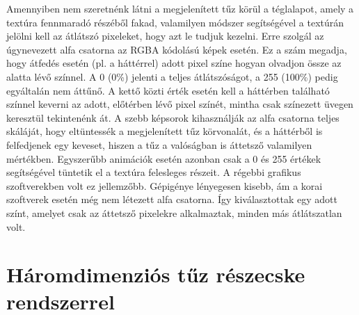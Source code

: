 Amennyiben nem szeretnénk látni a megjelenített tűz körül a téglalapot, amely a textúra fennmaradó részéből fakad, valamilyen módszer segítségével a textúrán jelölni kell az átlátszó pixeleket, hogy azt le tudjuk kezelni. Erre szolgál az úgynevezett alfa csatorna az RGBA kódolású képek esetén. Ez a szám megadja, hogy átfedés esetén (pl. a háttérrel) adott pixel színe hogyan olvadjon össze az alatta lévő színnel.  A 0 (0\%) jelenti a teljes átlátszóságot, a 255 (100\%) pedig egyáltalán nem áttűnő. A kettő közti érték esetén kell a háttérben található színnel keverni az adott, előtérben lévő pixel színét, mintha csak színezett üvegen keresztül tekintenénk át. A szebb képsorok kihasználják az alfa csatorna teljes skáláját, hogy eltüntessék a megjelenített tűz körvonalát, és a háttérből is felfedjenek egy keveset, hiszen a tűz a valóságban is áttetsző valamilyen mértékben. Egyszerűbb animációk esetén azonban csak a 0 és 255 értékek segítségével tüntetik el a textúra felesleges részeit. A régebbi grafikus szoftverekben volt ez jellemzőbb. Gépigénye lényegesen kisebb, ám a korai szoftverek esetén még nem létezett alfa csatorna. Így kiválasztottak egy adott színt, amelyet csak az áttetsző pixelekre alkalmaztak, minden más átlátszatlan volt.





\section{Háromdimenziós tűz részecske rendszerrel}

















